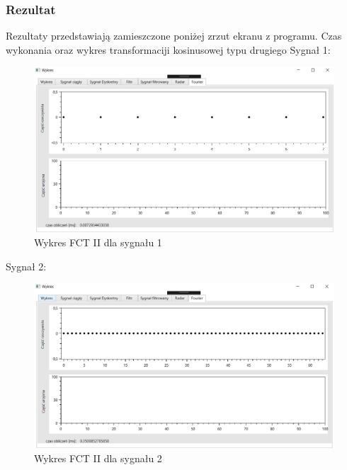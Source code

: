 \documentclass[12pt]{article}
\begin{document}
\subsubsection{Rezultat}

Rezultaty przedstawiają zamieszczone poniżej zrzut ekranu z programu. Czas wykonania oraz wykres transformaciji kosinusowej typu drugiego
\newpage
 Sygnał 1:
\begin{figure}[h!]
 \centering
 \includegraphics[width=12.3cm]{s13FCT2.PNG}
 \vspace{-0.3cm}
 \caption{Wykres FCT II dla sygnału 1}
 \label{Wykres dla wyników eksperymentu pierwszego}
\end{figure}

Sygnał 2:
\begin{figure}[h!]
 \centering
 \includegraphics[width=12.3cm]{s16FCT2.PNG}
 \vspace{-0.3cm}
 \caption{Wykres FCT II dla sygnału 2}
 \label{Wykres dla wyników eksperymentu pierwszego}
\end{figure}
\end{document}
